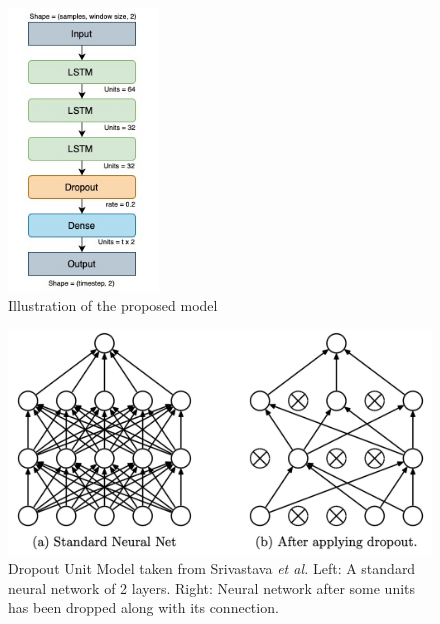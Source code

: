 \begin{figure}[t!]
    \centering
    \includegraphics[width=4cm]{pic/ch-Univariate/model-nn.jpg}
    \caption{Illustration of the proposed model}
    \label{fig:nn-model}
\end{figure}

\begin{figure}[t!]
    \centering
    \includegraphics[width=12cm]{pic/ch-Univariate/dropout.png}
    \caption{Dropout Unit Model taken from Srivastava \emph{et al.} Left: A standard neural network of 2 layers. Right: Neural network after some units has been dropped along with its connection.}
    \label{fig:dropout}
\end{figure}

